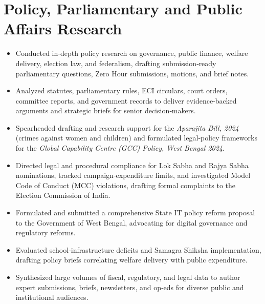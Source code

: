 \section{Policy, Parliamentary and Public Affairs Research}
\begin{itemize}[leftmargin=*, noitemsep]
    \item Conducted in‑depth policy research on governance, public finance, welfare delivery, election law, and federalism, drafting submission‑ready parliamentary questions, Zero Hour submissions, motions, and brief notes.
    \item Analyzed statutes, parliamentary rules, ECI circulars, court orders, committee reports, and government records to deliver evidence‑backed arguments and strategic briefs for senior decision‑makers.
    \item Spearheaded drafting and research support for the \textit{Aparajita Bill, 2024} (crimes against women and children) and formulated legal‑policy frameworks for the \textit{Global Capability Centre (GCC) Policy, West Bengal 2024}.
    \item Directed legal and procedural compliance for Lok Sabha and Rajya Sabha nominations, tracked campaign‑expenditure limits, and investigated Model Code of Conduct (MCC) violations, drafting formal complaints to the Election Commission of India.
    \item Formulated and submitted a comprehensive State IT policy reform proposal to the Government of West Bengal, advocating for digital governance and regulatory reforms.
    \item Evaluated school‑infrastructure deficits and Samagra Shiksha implementation, drafting policy briefs correlating welfare delivery with public expenditure.
    \item Synthesized large volumes of fiscal, regulatory, and legal data to author expert submissions, briefs, newsletters, and op‑eds for diverse public and institutional audiences.
\end{itemize}
